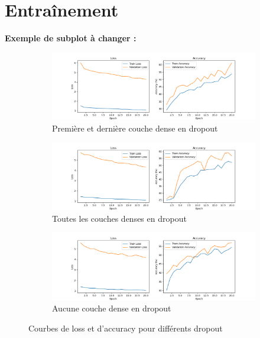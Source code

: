 \documentclass{report}
\begin{document}
\section{Entraînement}

\textbf{Exemple de subplot à changer :} 

\begin{figure}[H]
    \centering
    \begin{subfigure}{7.7cm}
        \centering
        \includegraphics[width=\linewidth]{Sources/Graphiques/1./LeNet/training_results_LeNet_dropouts_1_0_1.png}
        \caption{Première et dernière couche dense en dropout}
        \label{fig:training_LeNet_dropouts_1_0_1}
    \end{subfigure}
    \hfill
    \begin{subfigure}{7.7cm}
        \centering
        \includegraphics[width=\linewidth]{Sources/Graphiques/1./LeNet/training_results_dropouts_1_1_1.png}
        \caption{Toutes les couches denses en dropout}
        \label{fig:training_LeNet_dropouts_1_1_1}
    \end{subfigure}
    \hfill
    \begin{subfigure}{7.7cm}
        \centering
        \includegraphics[width=\linewidth]{Sources/Graphiques/1./LeNet/training_results_dropouts_0_0_0.png}
        \caption{Aucune couche dense en dropout}
        \label{fig:training_LeNet_dropouts_0_0_0}
    \end{subfigure}
    
    \caption{Courbes de loss et d'accuracy pour différents dropout}
    \label{fig:training_LeNet}
\end{figure}
\end{document}
